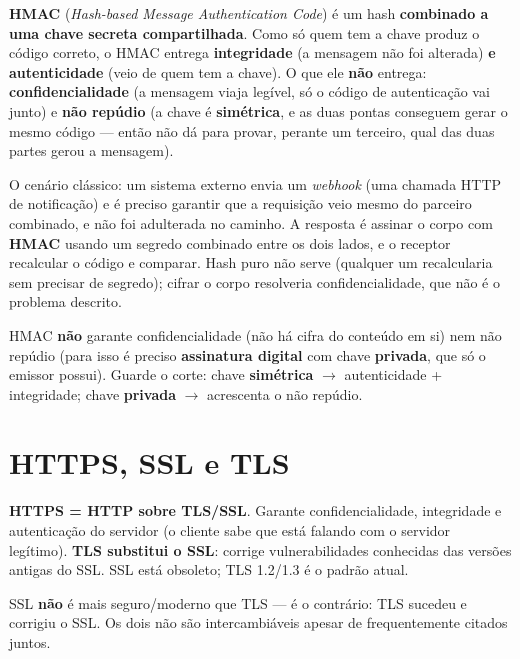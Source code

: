 \begin{conceito}
\textbf{HMAC} (\textit{Hash-based Message Authentication Code}) é um hash
\textbf{combinado a uma chave secreta compartilhada}. Como só quem tem a
chave produz o código correto, o HMAC entrega \textbf{integridade} (a
mensagem não foi alterada) \textbf{e} \textbf{autenticidade} (veio de
quem tem a chave). O que ele \textbf{não} entrega: \textbf{confidencialidade}
(a mensagem viaja legível, só o código de autenticação vai junto) e
\textbf{não repúdio} (a chave é \textbf{simétrica}, e as duas pontas
conseguem gerar o mesmo código --- então não dá para provar, perante um
terceiro, qual das duas partes gerou a mensagem).

O cenário clássico: um sistema externo envia um \textit{webhook} (uma
chamada HTTP de notificação) e é preciso garantir que a requisição veio
mesmo do parceiro combinado, e não foi adulterada no caminho. A resposta é
assinar o corpo com \textbf{HMAC} usando um segredo combinado entre os
dois lados, e o receptor recalcular o código e comparar. Hash puro não
serve (qualquer um recalcularia sem precisar de segredo); cifrar o corpo
resolveria confidencialidade, que não é o problema descrito.
\end{conceito}

\begin{cuidado}
HMAC \textbf{não} garante confidencialidade (não há cifra do conteúdo em
si) nem não repúdio (para isso é preciso \textbf{assinatura digital} com
chave \textbf{privada}, que só o emissor possui). Guarde o corte: chave
\textbf{simétrica} $\to$ autenticidade + integridade; chave
\textbf{privada} $\to$ acrescenta o não repúdio.
\end{cuidado}

\section{HTTPS, SSL e TLS}

\begin{conceito}
\textbf{HTTPS = HTTP sobre TLS/SSL}. Garante confidencialidade,
integridade e autenticação do servidor (o cliente sabe que está falando
com o servidor legítimo). \textbf{TLS substitui o SSL}: corrige
vulnerabilidades conhecidas das versões antigas do SSL. SSL está
obsoleto; TLS 1.2/1.3 é o padrão atual.
\end{conceito}

\begin{cuidado}
SSL \textbf{não} é mais seguro/moderno que TLS --- é o contrário: TLS
sucedeu e corrigiu o SSL. Os dois não são intercambiáveis apesar de
frequentemente citados juntos.
\end{cuidado}

